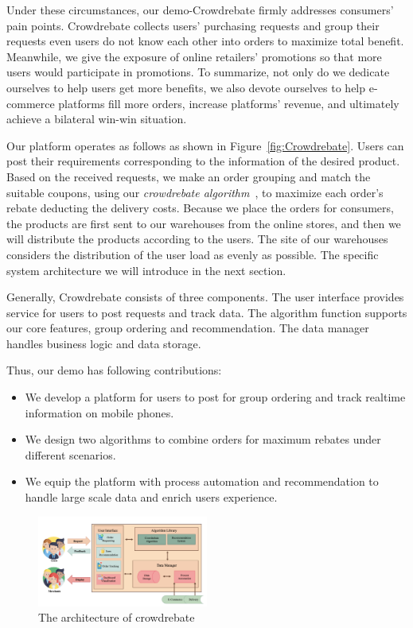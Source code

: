 Under these circumstances, our demo-Crowdrebate firmly addresses consumers' pain points. Crowdrebate collects users' purchasing requests and group their requests even users do not know each other into orders to maximize total benefit. Meanwhile, we give the exposure of online retailers' promotions so that more users would participate in promotions. To summarize, not only do we dedicate ourselves to help users get more benefits, we also devote ourselves to help e-commerce platforms fill more orders, increase platforms’ revenue, and ultimately achieve a bilateral win-win situation.

Our platform operates as follows as shown in Figure~\ref{fig:Crowdrebate}. Users can post their requirements corresponding to the information of the desired product. Based on the received requests, we make an order grouping and match the suitable coupons, using our \emph{crowdrebate algorithm}~\cite{Report}, to maximize each order's rebate deducting the delivery costs. Because we place the orders for consumers, the products are first sent to our warehouses from the online stores, and then we will distribute the products according to the users. The site of our warehouses considers the distribution of the user load as evenly as possible. The specific system architecture we will introduce in the next section.

Generally, Crowdrebate consists of three components. The user interface provides service for users to post requests and track data. The algorithm function supports our core features, group ordering and recommendation. The data manager handles business logic and data storage.

Thus, our demo has following contributions:
\begin{itemize}
	\item We develop a platform for users to post for group ordering and track realtime information on mobile phones.
	\item We design two algorithms to combine orders for maximum rebates under different scenarios.
	\item We equip the platform with process automation and recommendation to handle large scale data and enrich users experience.
\end{itemize}
\begin{figure}[t] \vspace{-2ex}
	\centering %
	\includegraphics[width=0.5\textwidth]{../figure/ar.png} %
	\caption{The architecture of crowdrebate} %
	\label{fig:ar} %
	\vspace{-2ex}
\end{figure}

